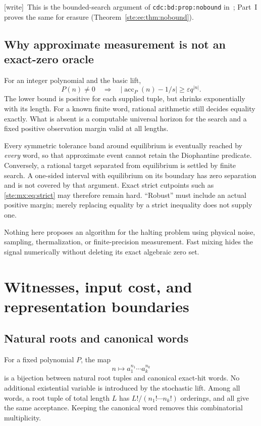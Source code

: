 \documentclass[11pt,letterpaper]{article}
\theoremstyle{definition}
\theoremstyle{remark}
\newcommand{\acc}{\operatorname{acc}}
\newcommand{\wtag}{\textup{[write]}}
\begin{document}
\wtag\ This is the bounded-search argument of \texttt{cdc:bd:prop:nobound} in~\cite{cdc}; Part~I proves the same for erasure (Theorem~\ref{ste:ee:thm:nobound}).


\subsection{Why approximate measurement is not an exact-zero oracle}

For an integer polynomial and the basic lift,
\begin{equation}\label{ste:mx:eq:gap}
 P(n)\ne0\quad\Longrightarrow\quad
 |\acc_P(n)-1/s|\geq\varepsilon q^{|n|}.
\end{equation}
The lower bound is positive for each supplied tuple, but shrinks exponentially
with its length. For a known finite word, rational arithmetic still decides
equality exactly. What is absent is a computable universal horizon for the
search and a fixed positive observation margin valid at all lengths.

Every symmetric tolerance band around equilibrium is eventually reached by
\emph{every} word, so that approximate event cannot retain the Diophantine
predicate. Conversely, a rational target separated from equilibrium is settled
by finite search. A one-sided interval with equilibrium on its boundary has
zero separation and is not covered by that argument. Exact strict cutpoints
such as \eqref{ste:mx:eq:strict} may therefore remain hard. ``Robust'' must include an
actual positive margin; merely replacing equality by a strict inequality does
not supply one.

Nothing here proposes an algorithm for the halting problem using physical
noise, sampling, thermalization, or finite-precision measurement. Fast mixing
hides the signal numerically without deleting its exact algebraic zero set.

\section{Witnesses, input cost, and representation boundaries}\label{ste:mx:sec:witnesses}

\subsection{Natural roots and canonical words}

For a fixed polynomial $P$, the map
\[
 n\longmapsto a_1^{n_1}\cdots a_k^{n_k}
\]
is a bijection between natural root tuples and canonical exact-hit words.
No additional existential variable is introduced by the stochastic lift.
Among all words, a root tuple of total length $L$ has
$L!/(n_1!\cdots n_k!)$ orderings, and all give the same acceptance. Keeping the
canonical word removes this combinatorial multiplicity.
\end{document}
